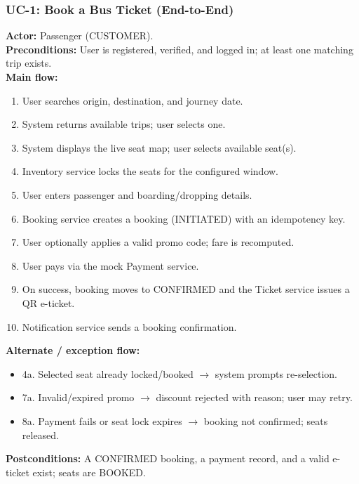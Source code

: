 \documentclass[11pt,a4paper]{article}
\begin{document}
\subsubsection*{UC-1: Book a Bus Ticket (End-to-End)}
\textbf{Actor:} Passenger (CUSTOMER).\\
\textbf{Preconditions:} User is registered, verified, and logged in; at least one matching trip exists.\\
\textbf{Main flow:}
\begin{enumerate}[leftmargin=1.6em]
  \item User searches origin, destination, and journey date.
  \item System returns available trips; user selects one.
  \item System displays the live seat map; user selects available seat(s).
  \item Inventory service locks the seats for the configured window.
  \item User enters passenger and boarding/dropping details.
  \item Booking service creates a booking (INITIATED) with an idempotency key.
  \item User optionally applies a valid promo code; fare is recomputed.
  \item User pays via the mock Payment service.
  \item On success, booking moves to CONFIRMED and the Ticket service issues a QR e-ticket.
  \item Notification service sends a booking confirmation.
\end{enumerate}
\textbf{Alternate / exception flow:}
\begin{itemize}[leftmargin=1.6em]
  \item 4a. Selected seat already locked/booked $\rightarrow$ system prompts re-selection.
  \item 7a. Invalid/expired promo $\rightarrow$ discount rejected with reason; user may retry.
  \item 8a. Payment fails or seat lock expires $\rightarrow$ booking not confirmed; seats released.
\end{itemize}
\textbf{Postconditions:} A CONFIRMED booking, a payment record, and a valid e-ticket exist; seats are BOOKED.
\end{document}
